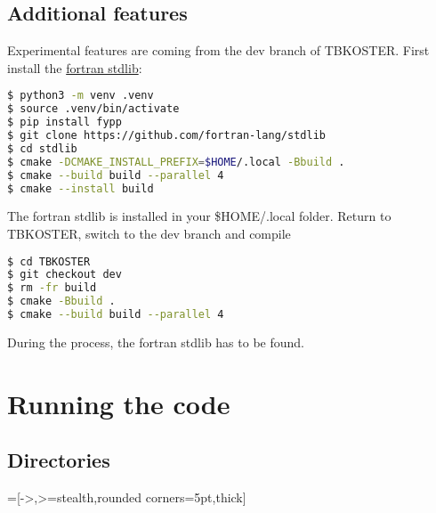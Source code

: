 \documentclass[12pt, onecolumn]{memoir}
\begin{document}
\section{Additional features}
Experimental features are coming from the dev branch of TBKOSTER.
First install the \href{https://stdlib.fortran-lang.org/}{fortran stdlib}:
\begin{lstlisting}[language=bash,basicstyle=\small\ttfamily,frame=single]
$ python3 -m venv .venv
$ source .venv/bin/activate
$ pip install fypp
$ git clone https://github.com/fortran-lang/stdlib
$ cd stdlib
$ cmake -DCMAKE_INSTALL_PREFIX=$HOME/.local -Bbuild .
$ cmake --build build --parallel 4
$ cmake --install build 
\end{lstlisting}
The fortran stdlib is installed in your \$HOME/.local folder.
Return to TBKOSTER, switch to the dev branch and compile 
\begin{lstlisting}[language=bash,basicstyle=\small\ttfamily,frame=single]
$ cd TBKOSTER
$ git checkout dev
$ rm -fr build
$ cmake -Bbuild .
$ cmake --build build --parallel 4
\end{lstlisting}
During the process, the fortran stdlib has to be found.

\vfil
\pagebreak

\chapter{Running the code}

\section{Directories}

=[->,>=stealth,rounded corners=5pt,thick]
\end{document}
